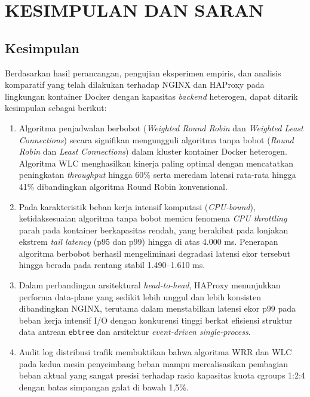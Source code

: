 
\chapter{KESIMPULAN DAN SARAN}

\section{Kesimpulan}
Berdasarkan hasil perancangan, pengujian eksperimen empiris, dan analisis komparatif yang telah dilakukan terhadap NGINX dan HAProxy pada lingkungan kontainer Docker dengan kapasitas \textit{backend} heterogen, dapat ditarik kesimpulan sebagai berikut:
\begin{enumerate}
    \item Algoritma penjadwalan berbobot (\textit{Weighted Round Robin} dan \textit{Weighted Least Connections}) secara signifikan mengungguli algoritma tanpa bobot (\textit{Round Robin} dan \textit{Least Connections}) dalam kluster kontainer Docker heterogen. Algoritma WLC menghasilkan kinerja paling optimal dengan mencatatkan peningkatan \textit{throughput} hingga 60\% serta meredam latensi rata-rata hingga 41\% dibandingkan algoritma Round Robin konvensional.
    \item Pada karakteristik beban kerja intensif komputasi (\textit{CPU-bound}), ketidaksesuaian algoritma tanpa bobot memicu fenomena \textit{CPU throttling} parah pada kontainer berkapasitas rendah, yang berakibat pada lonjakan ekstrem \textit{tail latency} (p95 dan p99) hingga di atas 4.000 ms. Penerapan algoritma berbobot berhasil mengeliminasi degradasi latensi ekor tersebut hingga berada pada rentang stabil 1.490--1.610 ms.
    \item Dalam perbandingan arsitektural \textit{head-to-head}, HAProxy menunjukkan performa data-plane yang sedikit lebih unggul dan lebih konsisten dibandingkan NGINX, terutama dalam menstabilkan latensi ekor p99 pada beban kerja intensif I/O dengan konkurensi tinggi berkat efisiensi struktur data antrean \texttt{ebtree} dan arsitektur \textit{event-driven single-process}.
    \item Audit log distribusi trafik membuktikan bahwa algoritma WRR dan WLC pada kedua mesin penyeimbang beban mampu merealisasikan pembagian beban aktual yang sangat presisi terhadap rasio kapasitas kuota cgroups 1:2:4 dengan batas simpangan galat di bawah 1,5\%.
\end{enumerate}

